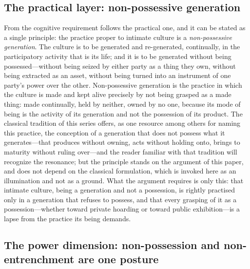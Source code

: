 \subsection*{The practical layer: non-possessive generation}

From the cognitive requirement follows the practical one, and it can be stated as a single principle: the practice proper to intimate culture is a \emph{non-possessive generation}. The culture is to be generated and re-generated, continually, in the participatory activity that is its life; and it is to be generated without being possessed---without being seized by either party as a thing they own, without being extracted as an asset, without being turned into an instrument of one party's power over the other. Non-possessive generation is the practice in which the culture is made and kept alive precisely by not being grasped as a made thing: made continually, held by neither, owned by no one, because its mode of being is the activity of its generation and not the possession of its product. The classical tradition of this series offers, as one resource among others for naming this practice, the conception of a generation that does not possess what it generates---that produces without owning, acts without holding onto, brings to maturity without ruling over---and the reader familiar with that tradition will recognize the resonance; but the principle stands on the argument of this paper, and does not depend on the classical formulation, which is invoked here as an illumination and not as a ground. What the argument requires is only this: that intimate culture, being a generation and not a possession, is rightly practised only in a generation that refuses to possess, and that every grasping of it as a possession---whether toward private hoarding or toward public exhibition---is a lapse from the practice its being demands.

\subsection*{The power dimension: non-possession and non-entrenchment are one posture}


